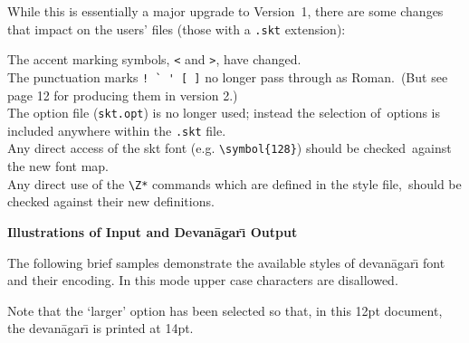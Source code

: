 \documentclass[12pt]{article}
\begin{document}
While this is essentially a major upgrade to Version~1, there are some changes
that impact on the users' files (those with a \verb+.skt+ extension):

\makebox[8mm][c]{$\bullet$}
      The accent marking symbols, \verb+<+ and \verb+>+, have changed.\\
\makebox[8mm][c]{$\bullet$}
      The punctuation marks \verb+! ` ' [ ]+ no longer pass through as 
      Roman.\newline\hspace*{8mm}\ (But see page 12 for producing them 
      in version 2.)\\
\makebox[8mm][c]{$\bullet$}
      The option file (\verb+skt.opt+) is no longer used; instead the 
      selection of\newline\hspace*{8mm}\ 
      options is included anywhere within the \verb+.skt+ file.\\
\makebox[8mm][c]{$\bullet$}
      Any direct access of the skt font (e.g. \verb+\symbol{128}+) should be 
      checked\newline\hspace*{8mm}\ 
      against the new font map.\\
\makebox[8mm][c]{$\bullet$}
      Any direct use of the \verb+\Z*+ commands which are defined in the style 
      file,\newline\hspace*{8mm}\ 
      should be checked against their new definitions.
\vspace{5mm}

{\large \textbf{Illustrations of Input and {\sktX Devan\=agar\={\i}} Output}\par}

The following brief samples demonstrate the available styles of 
{\skti devan\=agar\={\i}\/} font and their encoding. In this mode upper 
case characters are disallowed. 

Note that the `larger' option has been selected so that, in
this 12pt document, the {\skti devan\=agar\={\i}\/} is printed at 14pt.
\end{document}
